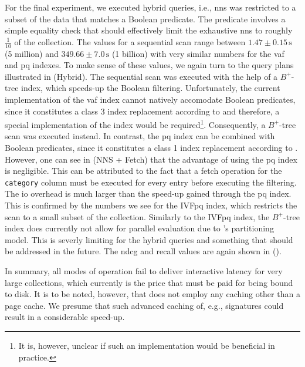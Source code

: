 For the final experiment, we executed hybrid queries, i.e., \acrshort{nns} was restricted to a subset of the data that matches a Boolean predicate. The predicate involves a simple equality check that should effectively limit the exhaustive \acrshort{nns} to roughly $\frac{1}{10}$ of the collection. The values for a sequential scan range between $1.47 \pm 0.15 \, \si{\second}$ (5 million) and $349.66 \pm 7.0 \, \si{\second}$ (1 billion) with very similar numbers for the \acrshort{vaf} and \acrshort{pq} indexes. To make sense of these values, we again turn to the query plans illustrated in  (Hybrid). The sequential scan was executed with the help of a $B^{+}$-tree index, which speeds-up the Boolean filtering. Unfortunately, the current implementation of the \acrshort{vaf} index cannot natively accomodate Boolean predicates, since it constitutes a class 3 index replacement according to  and therefore, a special implementation of the index would be required\footnote{It is, however, unclear if such an implementation would be beneficial in practice.}. Consequently, a $B^{+}$-tree scan was executed instead. In contrast, the \acrshort{pq} index can be combined with Boolean predicates, since it constitutes a class 1 index replacement according to . However, one can see in  (NNS + Fetch) that the advantage of using the \acrshort{pq} index is negligible.
This can be attributed to the fact that a fetch operation for the \texttt{category} column must be executed for every entry before executing the filtering. The \acrshort{io} overhead is much larger than the speed-up gained through the \acrshort{pq} index. This is confirmed by the numbers we see for the IVF\acrshort{pq} index, which restricts the scan to a small subset of the collection. Similarly to the IVF\acrshort{pq} index, the $B^{+}$-tree index does currently not allow for parallel evaluation due to \cottontail{}'s partitioning model. This is severly limiting for the hybrid queries and something that should be addressed in the future. The \acrshort{ndcg} and recall values are again shown in  ().

In summary, all modes of operation fail to deliver interactive latency for very large collections, which currently is the price that must be paid for being bound to disk. It is to be noted, however, that \cottontail{} does not employ any caching other than a page cache. We presume that such advanced caching of, e.g., signatures could result in a considerable speed-up.

